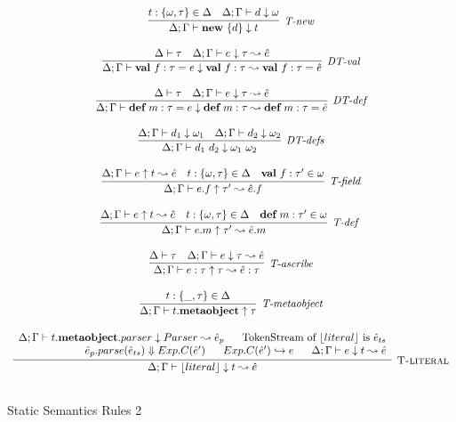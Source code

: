 \begin{figure}
\centering
\[
\begin{array}{c}

\infer[\textit{T-new}]
	{\Delta; \Gamma \vdash \keyw{new}\ \{ d \} \downarrow  t }
	{ t:\{\omega,\tau\} \in \Delta & \Delta;\Gamma \vdash d \downarrow \omega} \\[3ex]


\infer[\textit{DT-val}]
	{\Delta; \Gamma \vdash \keyw{val}~ f:\tau = e \downarrow \keyw{val}~ f:\tau  \leadsto \keyw{val}~ f:\tau = \hat{e}}
	{\Delta \vdash \tau &\Delta; \Gamma \vdash e \downarrow \tau \leadsto \hat{e} } \\[3ex]
	
\infer[\textit{DT-def}]
	{\Delta; \Gamma \vdash \keyw{def}~ m:\tau = e \downarrow \keyw{def}~ m:\tau \leadsto \keyw{def}~ m:\tau = \hat{e} }
	{\Delta \vdash \tau  & \Delta; \Gamma \vdash e  \downarrow \tau \leadsto \hat{e} } \\[3ex]

	
\infer[\textit{DT-defs}]
	{\Delta; \Gamma \vdash d_1\ d_2 \downarrow \omega_1\ \omega_2 }
	{\Delta; \Gamma \vdash d_1 \downarrow \omega_1 &  \Delta; \Gamma \vdash d_2 \downarrow \omega_2 } \\[3ex]


\infer[\textit{T-field}]
	{\Delta; \Gamma \vdash  e.f \uparrow \tau' \leadsto \hat{e}.f} 
	{\Delta; \Gamma \vdash e \uparrow t \leadsto \hat{e} & t:\{\omega, \tau\}\in \Delta & \keyw{val}\ f:\tau' \in \omega  }\\[3ex]

 
\infer[\textit{T-def }]
	{\Delta; \Gamma \vdash  e.m \uparrow\tau' \leadsto \hat{e}.m} 
	{\Delta; \Gamma \vdash e \uparrow t \leadsto \hat{e} & t: \{\omega, \tau\} \in \Delta & \keyw{def}\ m:\tau' \in \omega }\\[3ex]

\infer[\textit{T-ascribe}]
	{\Delta; \Gamma  \vdash  e:\tau \uparrow \tau \leadsto \hat{e}:\tau}
	{\Delta \vdash \tau & \Delta; \Gamma \vdash e \downarrow \tau \leadsto \hat{e} } \\[3ex]


\infer[\textit{T-metaobject}]
        {\Delta; \Gamma \vdash t.\keyw{metaobject} \uparrow \tau   }
	{t:\{\_, \tau\} \in \Delta} \\[3ex]

\infer[\textsc{T-literal}]
	  {\Delta; \Gamma \vdash \lfloor literal \rfloor \downarrow t \leadsto \hat{e} }
	  {\renewcommand{\arraystretch}{1}
	    \begin{array}{r}
	    \Delta;\Gamma \vdash t.\keyw{metaobject}.parser\downarrow Parser \leadsto \hat{e}_p ~~~~~ \text{TokenStream of~} \lfloor literal \rfloor\ \text{is}\ \hat{e}_{ts}\\
            \hat{e}_p.parse(\hat{e}_{ts}) \Downarrow Exp.C(\hat{e}') ~~~~~ Exp.C(\hat{e}') \hookrightarrow e ~~~~~ \Delta;\Gamma\vdash e\downarrow t \leadsto \hat{e}
            \end{array}
       } \\[3ex]   
\end{array}
\]
\caption{Static Semantics Rules 2}
\end{figure}


